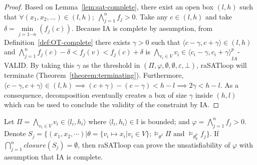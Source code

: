 \begin{proof}
Based on Lemma~\ref{lem:sat-complete}, there exist an open box $(l, h)$ such that $\forall (x_1, x_2, ...) \in (l, h); \; \bigwedge\limits_{j=1}^n f_j > 0 $. Take any $c \in (l, h)$ and take $\delta = \min\limits_{j = 1\cdots n}(f_j(c))$. Because IA is complete by assumption, from Definition~\ref{def:OT-complete} there exists $\gamma > 0$ such that $\langle c - \gamma, c + \gamma \rangle \in (l, h)$ and $\bigwedge\limits_{j = 1}^n f_j(c) - \delta < f_j(v) < f_j(c) + \delta$ is ${\bigwedge\limits_{v_i \in V}v_i \in \langle c_i - \gamma, c_i + \gamma \rangle}^p_{IA}$-VALID. By taking this $\gamma$ as the threshold in $(\Pi, \varphi, \emptyset, \emptyset, \varepsilon, \bot)$, raSATloop will terminate (Theorem~\ref{theorem:terminating}). Furthermore, $\langle c - \gamma, c + \gamma \rangle \in (l, h) \implies (c + \gamma) - (c - \gamma) < h - l \implies 2\gamma < h - l$. As a consequence, decomposition eventually creates a box of size $\gamma$ inside $(h, l)$ which can be used to conclude the validity of the constraint by IA.
\end{proof}


\begin{theorem} \label{theorem:UNSAT-complete}
\sloppy
Let $\Pi = \bigwedge\limits_{v_i \in V} v_i \in \langle l_i, h_i \rangle$ where $\langle l_i, h_i \rangle \in \mathbb{I}$ is bounded; and ${\varphi = \bigwedge\limits_{j = 1}^n f_j > 0}$. Denote $S_j = \{(x_1, x_2, \cdots) | \theta = \{v_i \mapsto x_i | v_i \in V \};\models_{\theta^I} \Pi \text{ and } \models_{\theta^p_\mathbb{R}}f_j \}$. If $\bigcap\limits_{j = 1}^nclosure(S_j) = \emptyset$, then raSATloop can prove the unsatisfiability of $\varphi$ with assumption that IA is complete.
\end{theorem}


